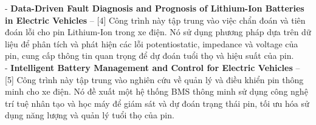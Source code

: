 \documentclass[a4paper,13pt]{article}
\theoremstyle{mytheor}
\begin{document}
- \textbf{Data-Driven Fault Diagnosis and Prognosis of Lithium-Ion Batteries in Electric Vehicles} – [4] Công trình này tập trung vào việc chẩn đoán và tiên đoán lỗi cho pin Lithium-Ion trong xe điện. Nó sử dụng phương pháp dựa trên dữ liệu để phân tích và phát hiện các lỗi potentiostatic, impedance và voltage của pin, cung cấp thông tin quan trọng để dự đoán tuổi thọ và hiệu suất của pin.\\

- \textbf{Intelligent Battery Management and Control for Electric Vehicles} – [5] Công trình này tập trung vào nghiên cứu về quản lý và điều khiển pin thông minh cho xe điện. Nó đề xuất một hệ thống BMS thông minh sử dụng công nghệ trí tuệ nhân tạo và học máy để giám sát và dự đoán trạng thái pin, tối ưu hóa sử dụng năng lượng và quản lý tuổi thọ của pin.\\
\end{document}
